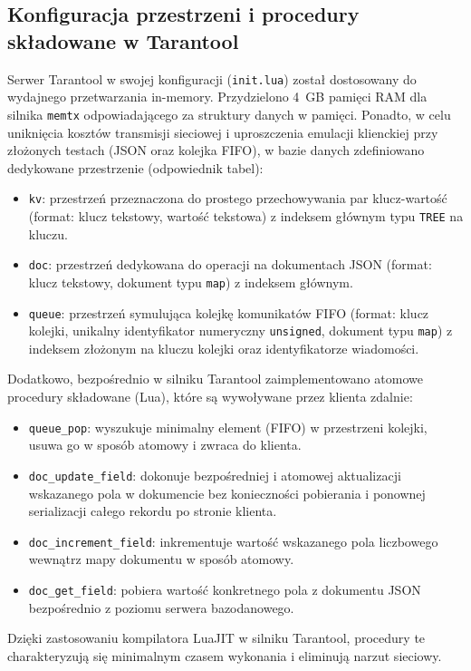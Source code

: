 \subsection{Konfiguracja przestrzeni i procedury składowane w Tarantool}
Serwer Tarantool w swojej konfiguracji (\texttt{init.lua}) został dostosowany do wydajnego przetwarzania in-memory. Przydzielono 4~GB pamięci RAM dla silnika \texttt{memtx} odpowiadającego za struktury danych w pamięci. Ponadto, w celu uniknięcia kosztów transmisji sieciowej i uproszczenia emulacji klienckiej przy złożonych testach (JSON oraz kolejka FIFO), w bazie danych zdefiniowano dedykowane przestrzenie (odpowiednik tabel):
\begin{itemize}
    \item \texttt{kv}: przestrzeń przeznaczona do prostego przechowywania par klucz-wartość (format: klucz tekstowy, wartość tekstowa) z indeksem głównym typu \texttt{TREE} na kluczu.
    \item \texttt{doc}: przestrzeń dedykowana do operacji na dokumentach JSON (format: klucz tekstowy, dokument typu \texttt{map}) z indeksem głównym.
    \item \texttt{queue}: przestrzeń symulująca kolejkę komunikatów FIFO (format: klucz kolejki, unikalny identyfikator numeryczny \texttt{unsigned}, dokument typu \texttt{map}) z indeksem złożonym na kluczu kolejki oraz identyfikatorze wiadomości.
\end{itemize}
Dodatkowo, bezpośrednio w silniku Tarantool zaimplementowano atomowe procedury składowane (Lua), które są wywoływane przez klienta zdalnie:
\begin{itemize}
    \item \texttt{queue\_pop}: wyszukuje minimalny element (FIFO) w przestrzeni kolejki, usuwa go w sposób atomowy i zwraca do klienta.
    \item \texttt{doc\_update\_field}: dokonuje bezpośredniej i atomowej aktualizacji wskazanego pola w dokumencie bez konieczności pobierania i ponownej serializacji całego rekordu po stronie klienta.
    \item \texttt{doc\_increment\_field}: inkrementuje wartość wskazanego pola liczbowego wewnątrz mapy dokumentu w sposób atomowy.
    \item \texttt{doc\_get\_field}: pobiera wartość konkretnego pola z dokumentu JSON bezpośrednio z poziomu serwera bazodanowego.
\end{itemize}
Dzięki zastosowaniu kompilatora LuaJIT w silniku Tarantool, procedury te charakteryzują się minimalnym czasem wykonania i eliminują narzut sieciowy.

